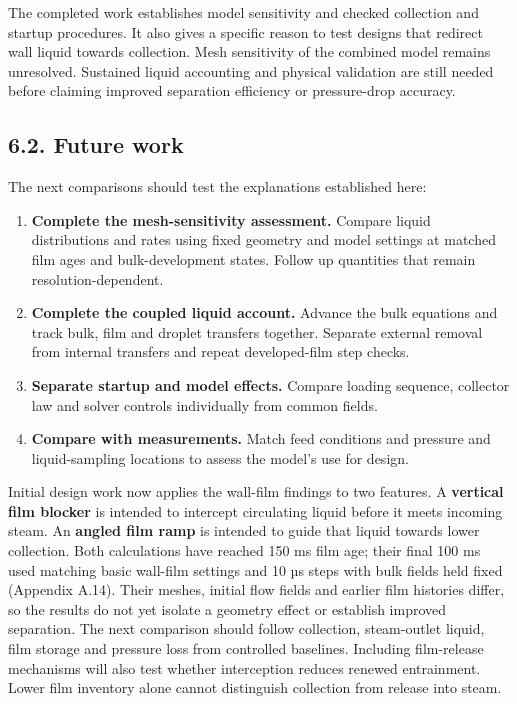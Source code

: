 \documentclass[
  12pt,
  a4paper,
]{article}
\providecommand{\tightlist}{%
  \setlength{\itemsep}{0pt}\setlength{\parskip}{0pt}}
\begin{document}
The completed work establishes model sensitivity and checked collection
and startup procedures. It also gives a specific reason to test designs
that redirect wall liquid towards collection. Mesh sensitivity of the
combined model remains unresolved. Sustained liquid accounting and
physical validation are still needed before claiming improved separation
efficiency or pressure-drop accuracy.

\subsection{6.2. Future work}\label{future-work}

The next comparisons should test the explanations established here:

\begin{enumerate}
\def\labelenumi{\arabic{enumi}.}
\tightlist
\item
  \textbf{Complete the mesh-sensitivity assessment.} Compare liquid
  distributions and rates using fixed geometry and model settings at
  matched film ages and bulk-development states. Follow up quantities
  that remain resolution-dependent.
\item
  \textbf{Complete the coupled liquid account.} Advance the bulk
  equations and track bulk, film and droplet transfers together.
  Separate external removal from internal transfers and repeat
  developed-film step checks.
\item
  \textbf{Separate startup and model effects.} Compare loading sequence,
  collector law and solver controls individually from common fields.
\item
  \textbf{Compare with measurements.} Match feed conditions and pressure
  and liquid-sampling locations to assess the model's use for design.
\end{enumerate}

Initial design work now applies the wall-film findings to two features.
A \textbf{vertical film blocker} is intended to intercept circulating
liquid before it meets incoming steam. An \textbf{angled film ramp} is
intended to guide that liquid towards lower collection. Both
calculations have reached 150 ms film age; their final 100 ms used
matching basic wall-film settings and 10 µs steps with bulk fields held
fixed (Appendix A.14). Their meshes, initial flow fields and earlier
film histories differ, so the results do not yet isolate a geometry
effect or establish improved separation. The next comparison should
follow collection, steam-outlet liquid, film storage and pressure loss
from controlled baselines. Including film-release mechanisms will also
test whether interception reduces renewed entrainment. Lower film
inventory alone cannot distinguish collection from release into steam.
\end{document}

